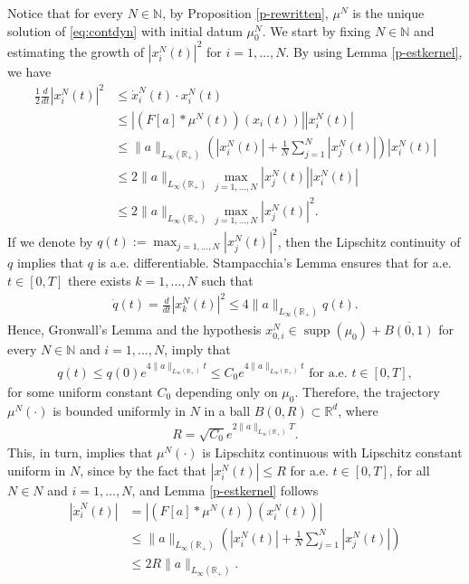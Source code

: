 \documentclass[A4paper,11pt]{article}
\theoremstyle{definition}
\newcommand{\N}{\mathbb{N}}
\newcommand{\R}{\mathbb{R}}
\DeclareMathOperator{\supp}{supp}
\begin{document}
Notice that for every $N \in \N$, by Proposition \ref{p-rewritten}, $\mu^N$ is the unique solution of \eqref{eq:contdyn} with initial datum $\mu^N_0$. We start by fixing $N \in \N$ and estimating the growth of $|x_i^N(t)|^2$ for $i = 1, \ldots, N$. By using Lemma \ref{p-estkernel}, we have
\begin{align*}
\frac{1}{2}\frac{d}{dt} |x_i^N(t)|^2 & \leq \dot{x}_i^N(t) \cdot x_i^N(t) \\
& \leq \left|(F[a]*\mu^N(t))(x_i(t))\right| |x_i^N(t)| \\
& \leq \|a\|_{L_{\infty}(\R_+)}\left( |x_i^N(t)| + \frac{1}{N} \sum^N_{j = 1}|x_j^N(t)| \right) |x_i^N(t)| \\
& \leq 2 \|a\|_{L_{\infty}(\R_+)}\max_{j = 1, \ldots, N} |x_j^N(t)| |x_i^N(t)| \\
& \leq 2 \|a\|_{L_{\infty}(\R_+)}\max_{j = 1, \ldots, N} |x_j^N(t)|^2.
\end{align*}
If we denote by $q(t) := \max_{j = 1, \ldots, N} |x_j^N(t)|^2$, then the Lipschitz continuity of $q$ implies that $q$ is a.e. differentiable. Stampacchia's Lemma \cite[Chapter 2, Lemma A.4]{Kin-Sta} ensures that for a.e. $t \in [0,T]$ there exists $k = 1, \ldots, N$ such that
\begin{align*}
\dot{q}(t) = \frac{d}{dt} |x_k^N(t)|^2 \leq 4 \|a\|_{L_{\infty}(\R_+)} q(t).
\end{align*}
Hence, Gronwall's Lemma and the hypothesis $x^{N}_{0,i} \in \supp(\mu_0) + \overline{B(0,1)}$ for every $N \in \N$ and $i = 1, \ldots, N$, imply that
\begin{align*}
q(t) \leq q(0) e^{4 \|a\|_{L_{\infty}(\R_+)} t} \leq C_0 e^{4 \|a\|_{L_{\infty}(\R_+)} t} \text{ for a.e. } t \in [0,T],
\end{align*}
for some uniform constant $C_0$ depending only on $\mu_0$. Therefore, the trajectory $\mu^N(\cdot)$ is bounded uniformly in $N$ in a ball $B(0,R) \subset \R^d$, where
\begin{align}\label{Rest}
R =  \sqrt{C_0} e^{2 \|a\|_{L_{\infty}(\R_+)} T}.
\end{align}
This, in turn, implies that $\mu^N(\cdot)$ is Lipschitz continuous with Lipschitz constant uniform in $N$, since by the fact that $|x^N_i(t)| \leq R$ for a.e. $t \in [0,T]$, for all $N \in N$ and $i = 1, \ldots, N$, and Lemma \ref{p-estkernel} follows
\begin{align*}
|\dot{x}^N_i(t)| &= |(F[a]*\mu^N(t))(x^N_i(t))| \\
&\leq \|a\|_{L_{\infty}(\R_+)} \left( |x^N_i(t)| + \frac{1}{N}\sum^N_{j = 1}|x^N_j(t)|\right) \\
&\leq 2R\|a\|_{L_{\infty}(\R_+)}.
\end{align*}
\end{document}
